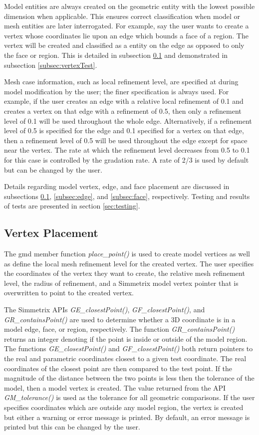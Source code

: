 \documentclass[a4paper, 12pt]{article}
\begin{document}
Model entities are always created on the geometric entity with the
lowest possible dimension when applicable. This ensures correct classification when model
or mesh entities are later interrogated. For example, say the
user wants to create a vertex whose coordinates lie upon an edge
which bounds a face of a region. The vertex will be created and 
classified as a entity on the edge as opposed to only the face or region. 
This is detailed in subsection \ref{subsec:vertex} and  demonstrated 
in subsection \ref{subsec:vertexTest}.

Mesh case information, such as local refinement level, are
specified at during model modification by the user; the finer
specification is always used. For example, if the user 
creates an edge with a relative local refinement of 0.1
and creates a vertex on that edge with a refinement of 0.5, 
then only a refinement level of 0.1 will be used throughout 
the whole edge. Alternatively, if a refinement level of 0.5 
is specified for the edge and 0.1 specified for a vertex on that
edge, then a refinement level of 0.5 will be used throughout the 
edge except for space near the vertex. The rate at which the 
refinement level decreases from 0.5 to 0.1 for this case is controlled
by the gradation rate. A rate of 2/3 is used by default 
but can be changed by the user. 

Details regarding model vertex, edge, and face placement are 
discussed in subsections \ref{subsec:vertex}, \ref{subsec:edge}, 
and \ref{subsec:face}, respectively. Testing and results of tests
are presented in section \ref{sec:testing}.

\subsection{Vertex Placement} \label{subsec:vertex}
The gmd member function \emph{place\_point()} is used to create model
vertices as well as define the local mesh refinement level for the created vertex.
The user specifies the coordinates of the vertex they want to create, the 
relative mesh refinement level, the radius of refinement, and a Simmetrix
model vertex pointer that is overwritten to point to the created vertex. 

The Simmetrix APIs \emph{GE\_closestPoint()}, \emph{GF\_closestPoint()}, 
and \emph{GR\_containsPoint()} are used to determine whether a 3D coordinate 
is in a model edge, face, or region, respectively. The function \emph{GR\_containsPoint()}
returns an integer denoting if the point is inside or outside of the model region. 
The functions \emph{GE\_closestPoint()} and \emph{GF\_closestPoint()} both return 
pointers to the real and parametric coordinates closest to a given test coordinate. 
The real coordinates of the closest point are then compared to the test point.
If the magnitude of the distance between the two points is less then the 
tolerance of the model, then a model vertex is created. 
The value returned from the API \emph{GM\_tolerance()} is used as the 
tolerance for all geometric comparisons. If the user specifies coordinates
which are outside any model region, the vertex is created but either a 
warning or error message is printed. By default, an error message is printed
but this can be changed by the user. 
\end{document}
